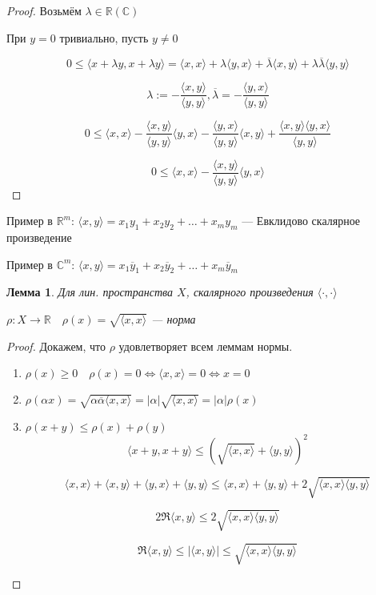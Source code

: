 \documentclass[12pt]{article}
\theoremstyle{plain}
\newtheorem{lemma}{Лемма}
\theoremstyle{remark}
\theoremstyle{definition}
\begin{document}
\begin{proof}
    Возьмём $\lambda\in\mathbb{R} (\mathbb{C})$

    При $y=0$ тривиально, пусть $y\not = 0$

    $$0\leq \langle x + \lambda y,x + \lambda y\rangle = \langle x,x\rangle + \lambda\langle y,x\rangle + \overline\lambda\langle x,y\rangle+\lambda\overline\lambda\langle y,y\rangle$$

    $$\lambda := -\frac{\langle x,y\rangle}{\langle y,y\rangle}, \overline\lambda = -\frac{\langle y,x\rangle}{\langle y,y\rangle}$$

    $$0\leq\langle x,x\rangle - \frac{\langle x,y\rangle}{\langle y,y\rangle}\langle y,x\rangle - \frac{\langle y,x\rangle}{\langle y,y\rangle}\langle x,y\rangle+\frac{\langle x,y\rangle\langle y,x\rangle}{\langle y,y\rangle}$$

    $$0\leq \langle x,x\rangle - \frac{\langle x,y\rangle}{\langle y,y\rangle}\langle y,x\rangle$$
\end{proof}

Пример в $\mathbb{R}^m$: $\langle x,y\rangle = x_1y_1+x_2y_2+\ldots+x_my_m$ --- Евклидово скалярное произведение

Пример в $\mathbb{C}^m$: $\langle x,y\rangle = x_1\overline y_1+x_2\overline y_2+\ldots+x_m\overline y_m$

\begin{lemma}
    Для лин. пространства $X$, скалярного произведения $\langle \cdot ,\cdot \rangle$
    
    $\rho:X\to\mathbb{R} \quad \rho(x)=\sqrt{\langle x,x\rangle}$ --- норма
\end{lemma}

\begin{proof}
    Докажем, что $\rho$ удовлетворяет всем леммам нормы.
    \begin{enumerate}
        \item $\rho(x)\geq 0\quad \rho(x)=0\Leftrightarrow \langle x,x\rangle=0\Leftrightarrow x=0$
        \item $\rho(\alpha x) = \sqrt{\alpha\overline\alpha\langle x,x\rangle}=|\alpha|\sqrt{\langle x,x\rangle}=|\alpha|\rho(x)$
        \item $\rho(x+y)\leq \rho(x)+\rho(y)$
        $$\langle x+y,x+y\rangle \leq (\sqrt{\langle x,x\rangle} + \langle y,y\rangle)^2$$

        $$\langle x,x\rangle+\langle x,y\rangle+\langle y,x\rangle+\langle y,y\rangle\leq \langle x,x\rangle + \langle y,y\rangle + 2\sqrt{\langle x,x\rangle\langle y,y\rangle}$$

        $$2\Re\langle x,y\rangle\leq 2\sqrt{\langle x,x\rangle\langle y,y\rangle}$$

        $$\Re\langle x,y\rangle \leq |\langle x,y\rangle|\leq\sqrt{\langle x,x\rangle\langle y,y\rangle}$$
    \end{enumerate}
\end{proof}
\end{document}
